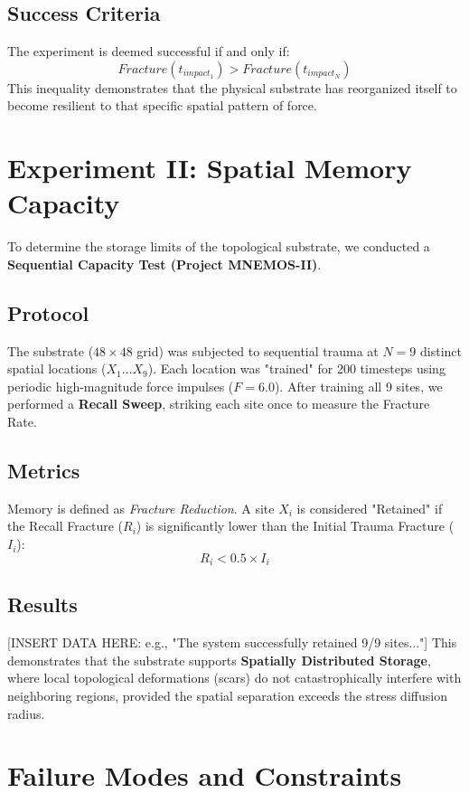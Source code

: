 \documentclass[11pt, a4paper]{article}
\begin{document}
\subsection{Success Criteria}
The experiment is deemed successful if and only if:
\[ Fracture(t_{impact_1}) > Fracture(t_{impact_N}) \]
This inequality demonstrates that the physical substrate has reorganized itself to become resilient to that specific spatial pattern of force.

\section{Experiment II: Spatial Memory Capacity}

To determine the storage limits of the topological substrate, we conducted a \textbf{Sequential Capacity Test (Project MNEMOS-II)}.

\subsection{Protocol}
The substrate ($48 \times 48$ grid) was subjected to sequential trauma at $N=9$ distinct spatial locations ($X_1 \dots X_9$). Each location was "trained" for 200 timesteps using periodic high-magnitude force impulses ($F=6.0$). After training all 9 sites, we performed a \textbf{Recall Sweep}, striking each site once to measure the Fracture Rate.

\subsection{Metrics}
Memory is defined as \textit{Fracture Reduction}. A site $X_i$ is considered "Retained" if the Recall Fracture ($R_i$) is significantly lower than the Initial Trauma Fracture ($I_i$):
\[ R_i < 0.5 \times I_i \]

\subsection{Results}
[INSERT DATA HERE: e.g., "The system successfully retained 9/9 sites..."]
This demonstrates that the substrate supports \textbf{Spatially Distributed Storage}, where local topological deformations (scars) do not catastrophically interfere with neighboring regions, provided the spatial separation exceeds the stress diffusion radius.

\section{Failure Modes and Constraints}
\end{document}
